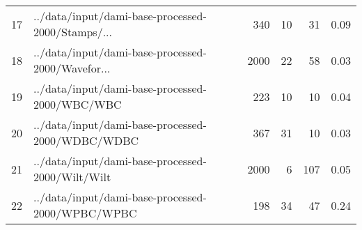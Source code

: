 \begin{tabular}{llrrrr}
17 &  ../data/input/dami-base-processed-2000/Stamps/... &   340 &    10 &     31 &           0.09 \\
18 &  ../data/input/dami-base-processed-2000/Wavefor... &  2000 &    22 &     58 &           0.03 \\
19 &     ../data/input/dami-base-processed-2000/WBC/WBC &   223 &    10 &     10 &           0.04 \\
20 &   ../data/input/dami-base-processed-2000/WDBC/WDBC &   367 &    31 &     10 &           0.03 \\
21 &   ../data/input/dami-base-processed-2000/Wilt/Wilt &  2000 &     6 &    107 &           0.05 \\
22 &   ../data/input/dami-base-processed-2000/WPBC/WPBC &   198 &    34 &     47 &           0.24 \\
\bottomrule
\end{tabular}
